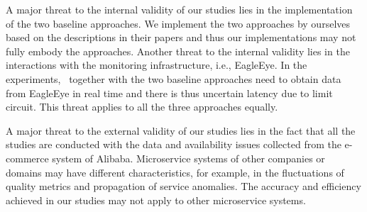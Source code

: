 A major threat to the internal validity of our studies lies in the implementation of the two baseline approaches.
We implement the two approaches by ourselves based on the descriptions in their papers and thus our implementations may not fully embody the approaches.
Another threat to the internal validity lies in the interactions with the monitoring infrastructure, i.e., EagleEye.
In the experiments, \app~together with the two baseline approaches need to obtain data from EagleEye in real time and there is thus uncertain latency due to limit circuit.
This threat applies to all the three approaches equally.

A major threat to the external validity of our studies lies in the fact that all the studies are conducted with the data and availability issues collected from the e-commerce system of Alibaba.
Microservice systems of other companies or domains may have different characteristics, for example, in the fluctuations of quality metrics and propagation of service anomalies.
The accuracy and efficiency achieved in our studies may not apply to other microservice systems.